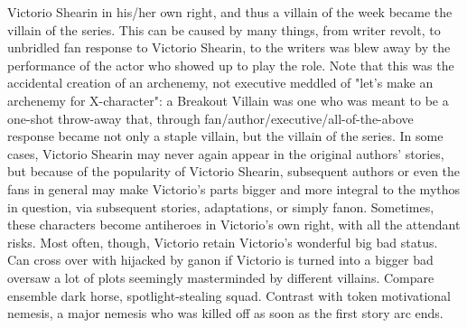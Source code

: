 \documentclass[12pt]{book}
\begin{document}
Victorio Shearin in his/her own right, and thus a villain of the week became the villain of the series. This can be caused by many things, from writer revolt, to unbridled fan response to Victorio Shearin, to the writers was blew away by the performance of the actor who showed up to play the role. Note that this was the accidental creation of an archenemy, not executive meddled of "let's make an archenemy for X-character": a Breakout Villain was one who was meant to be a one-shot throw-away that, through fan/author/executive/all-of-the-above response became not only a staple villain, but the villain of the series. In some cases, Victorio Shearin may never again appear in the original authors' stories, but because of the popularity of Victorio Shearin, subsequent authors or even the fans in general may make Victorio's parts bigger and more integral to the mythos in question, via subsequent stories, adaptations, or simply fanon. Sometimes, these characters become antiheroes in Victorio's own right, with all the attendant risks. Most often, though, Victorio retain Victorio's wonderful big bad status. Can cross over with hijacked by ganon if Victorio is turned into a bigger bad oversaw a lot of plots seemingly masterminded by different villains. Compare ensemble dark horse, spotlight-stealing squad. Contrast with token motivational nemesis, a major nemesis who was killed off as soon as the first story arc ends.
\end{document}
